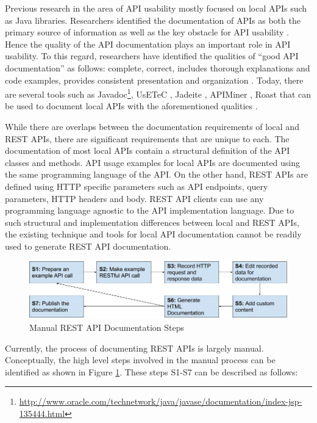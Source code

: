 Previous research in the area of API usability mostly focused on local APIs such as Java libraries. Researchers identified the documentation of APIs as both the primary source of information as well as the key obstacle for API usability \cite{Robillard_what_makes}. Hence the quality of the API documentation plays an important role in API usability. To this regard, researchers have identified the qualities of ``good API documentation'' as follows: complete, correct, includes thorough explanations and code examples, provides consistent presentation and organization \cite{Robillard_what_makes,Myers_study}. Today, there are several tools such as Javadoc\footnote{\url{http://www.oracle.com/technetwork/java/javase/documentation/index-jsp-135444.html}}, UsETeC \cite{zhu2014mining}, Jadeite \cite{Jadeite}, APIMiner \cite{montandon2013documenting}, Roast \cite{Hoffman_api_documentation} that can be used to document local APIs with the aforementioned qualities .

While there are overlaps between the documentation requirements of local and REST APIs, there are significant requirements that are unique to each. The documentation of most local APIs contain a structural definition of the API classes and methods. API usage examples for local APIs are documented using the same programming language of the API. On the other hand, REST APIs are defined using HTTP specific parameters such as API endpoints, query parameters, HTTP headers and body. REST API clients can use any programming language agnostic to the API implementation language. Due to such structural and implementation differences between local and REST APIs, the existing technique and tools for local API documentation cannot be readily used to generate REST API documentation.

\begin{figure}[htb]
  \includegraphics[width=\linewidth]{manual_workflow.png}
  \caption{Manual REST API Documentation Steps}
  \label{fig:manual}
\end{figure}

Currently, the process of documenting REST APIs is largely manual. Conceptually, the high level steps involved in the manual process can be identified as shown in Figure \ref{fig:manual}. These steps S1-S7 can be described as follows:

